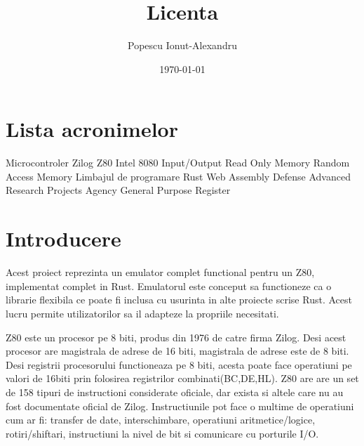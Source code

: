 \documentclass[titlepage,12pt]{article}
\begin{document}
\title{Licenta}
\author{Popescu Ionut-Alexandru}
\date{\today}

\maketitle
\renewcommand{\contentsname}{Cuprins}
\renewcommand{\listfigurename}{Lista figurilor} 
\renewcommand{\listtablename}{Lista tabelelor}
\renewcommand{\figurename}{Figura}
\renewcommand{\tablename}{Tabela}
\tableofcontents
\clearpage  
\listoffigures
\clearpage
\listoftables
\clearpage
\section*{Lista acronimelor} %
\begin{acronym}  
           {Microcontroler Zilog Z80}
         {Intel 8080}
            {Input/Output}
           {Read Only Memory}
           {Random Access Memory}
          {Limbajul de programare Rust}
          {Web Assembly}
         {Defense Advanced Research Projects Agency}
           {General Purpose Register}
    \end{acronym}
\clearpage

\section{Introducere}
Acest proiect reprezinta un emulator complet functional pentru un \ac {Z80}, implementat complet in \ac {Rust}.
Emulatorul este conceput sa functioneze ca o librarie flexibila ce poate fi inclusa cu usurinta in alte proiecte scrise Rust. Acest lucru permite utilizatorilor sa il adapteze la propriile necesitati.

\ac {Z80} este un procesor pe 8 biti, produs din 1976 de catre firma Zilog. Desi acest procesor are magistrala de adrese de 16 biti, magistrala de adrese este de 8 biti.
Desi registrii procesorului functioneaza pe 8 biti, acesta poate face operatiuni pe valori de 16biti prin folosirea registrilor combinati(BC,DE,HL).
Z80 are are un set de 158 tipuri de instructioni considerate oficiale, dar exista si altele care nu au fost documentate oficial de Zilog. Instructiunile pot face o multime de operatiuni cum ar fi: transfer de date, interschimbare, operatiuni aritmetice/logice, rotiri/shiftari, instructiuni la nivel de bit si comunicare cu porturile I/O.
\end{document}
